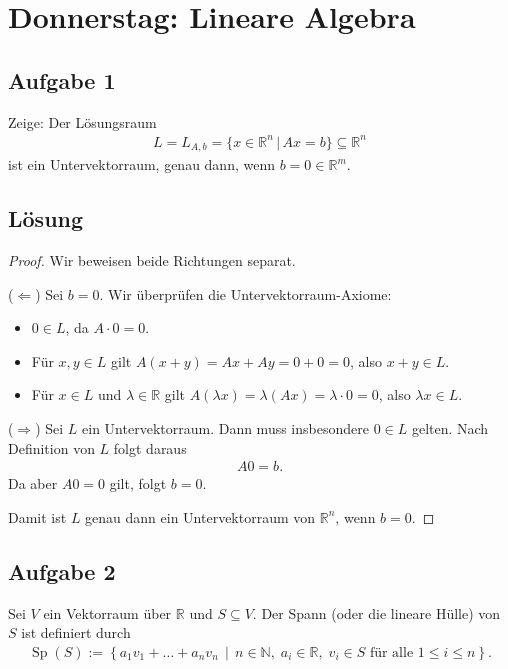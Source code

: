 \documentclass[a4paper,10pt]{article}
\newcommand{\N}{\mathbb{N}}
\newcommand{\R}{\mathbb{R}}
\newcommand{\Sp}{\operatorname{Sp}}
\newcommand{\s}[1]{#1}
\begin{document}
\section*{Donnerstag: Lineare Algebra}
\subsection*{Aufgabe 1}
Zeige: Der Lösungsraum
\begin{align*}
    L = L_{A,b}= \{x\in \R^n \,|\,Ax=b\}\subseteq \R^n
\end{align*}
ist ein Untervektorraum, genau dann, wenn $b=0\in \R^m$.

\s{\subsection*{Lösung}
\begin{proof}
Wir beweisen beide Richtungen separat.

($\Leftarrow$) Sei $b=0$. Wir überprüfen die Untervektorraum-Axiome:

\begin{itemize}
\item $0\in L$, da $A\cdot 0=0$.
\item Für $x,y\in L$ gilt $A(x+y)=Ax+Ay=0+0=0$, also $x+y\in L$.
\item Für $x\in L$ und $\lambda\in \R$ gilt $A(\lambda x)=\lambda(Ax)=\lambda\cdot 0=0$, also $\lambda x\in L$.
\end{itemize}

($\Rightarrow$) Sei $L$ ein Untervektorraum. Dann muss insbesondere
$0\in L$ gelten. Nach Definition von $L$ folgt daraus
\begin{align*}
    A0=b.
\end{align*}
Da aber $A0=0$ gilt, folgt $b=0$.

Damit ist $L$ genau dann ein Untervektorraum von $\R^n$, wenn $b=0$.
\end{proof}

}
\subsection*{Aufgabe 2}

Sei $V$ ein Vektorraum über $\R$ und $S\subseteq V$. Der Spann (oder die lineare Hülle) von $S$ ist definiert durch
\begin{align*}
    \Sp(S)
    :=
    \left\{
    a_1v_1+\ldots+a_nv_n
    \,\middle|\,
    n\in\N,\;
    a_i\in\R,\;
    v_i\in S
    \text{ für alle }1\leq i\leq n
    \right\}.
\end{align*}
\end{document}
